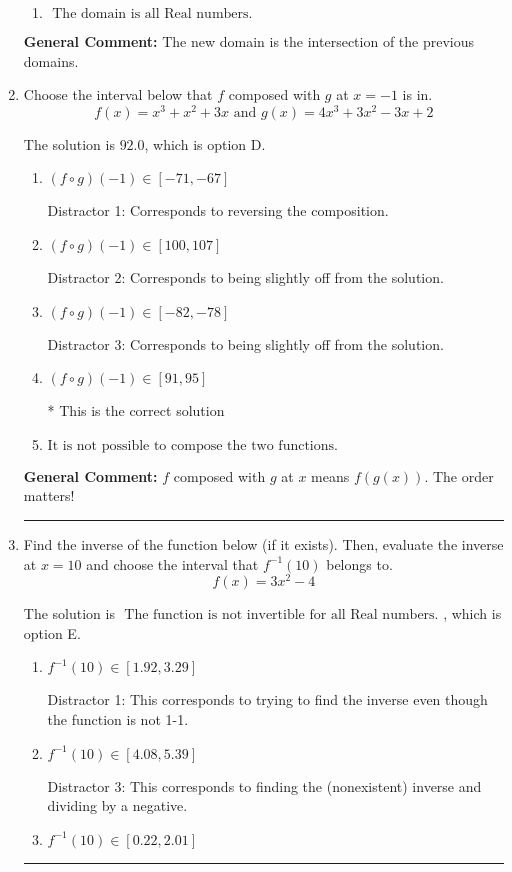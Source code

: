 \documentclass{extbook}[14pt]
\newcommand{\litem}[1]{\item #1

\rule{\textwidth}{0.4pt}}
\begin{document}
\begin{enumerate}
{\begin{enumerate}[label=\Alph*.]
\item \( \text{ The domain is all Real numbers. } \)


\end{enumerate}

\textbf{General Comment:} The new domain is the intersection of the previous domains.
}
\litem{
Choose the interval below that $f$ composed with $g$ at $x=-1$ is in.
\[ f(x) = x^{3} + x^{2} +3 x \text{ and } g(x) = 4x^{3} +3 x^{2} -3 x + 2 \]

The solution is \( 92.0 \), which is option D.\begin{enumerate}[label=\Alph*.]
\item \( (f \circ g)(-1) \in [-71, -67] \)

 Distractor 1: Corresponds to reversing the composition.
\item \( (f \circ g)(-1) \in [100, 107] \)

 Distractor 2: Corresponds to being slightly off from the solution.
\item \( (f \circ g)(-1) \in [-82, -78] \)

 Distractor 3: Corresponds to being slightly off from the solution.
\item \( (f \circ g)(-1) \in [91, 95] \)

* This is the correct solution
\item \( \text{It is not possible to compose the two functions.} \)


\end{enumerate}

\textbf{General Comment:} $f$ composed with $g$ at $x$ means $f(g(x))$. The order matters!
}
\litem{
Find the inverse of the function below (if it exists). Then, evaluate the inverse at $x = 10$ and choose the interval that $f^{-1}(10)$ belongs to.
\[ f(x) = 3 x^2 - 4 \]

The solution is \( \text{ The function is not invertible for all Real numbers. } \), which is option E.\begin{enumerate}[label=\Alph*.]
\item \( f^{-1}(10) \in [1.92, 3.29] \)

 Distractor 1: This corresponds to trying to find the inverse even though the function is not 1-1. 
\item \( f^{-1}(10) \in [4.08, 5.39] \)

 Distractor 3: This corresponds to finding the (nonexistent) inverse and dividing by a negative.
\item \( f^{-1}(10) \in [0.22, 2.01] \)


\end{enumerate}}
\end{enumerate}
\end{document}
